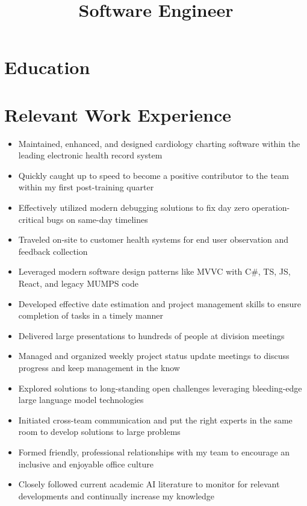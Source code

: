 \documentclass[10pt,a4paper,sans]{moderncv}
\title{Software Engineer}
\begin{document}
\makecvtitle

\section{Education}

\section{Relevant Work Experience}
\begin{itemize}
\item Maintained, enhanced, and designed cardiology charting software within the leading electronic health record system
\item Quickly caught up to speed to become a positive contributor to the team within my first post-training quarter
\item Effectively utilized modern debugging solutions to fix day zero operation-critical bugs on same-day timelines
\item Traveled on-site to customer health systems for end user observation and feedback collection
\item Leveraged modern software design patterns like MVVC with C\#, TS, JS, React, and legacy MUMPS code
\item Developed effective date estimation and project management skills to ensure completion of tasks in a timely manner
\item Delivered large presentations to hundreds of people at division meetings
\item Managed and organized weekly project status update meetings to discuss progress and keep management in the know
\item Explored solutions to long-standing open challenges leveraging bleeding-edge large language model technologies
\item Initiated cross-team communication and put the right experts in the same room to develop solutions to large problems
\item Formed friendly, professional relationships with my team to encourage an inclusive and enjoyable office culture
\item Closely followed current academic AI literature to monitor for relevant developments and continually increase my knowledge
\end{itemize}
\end{document}
